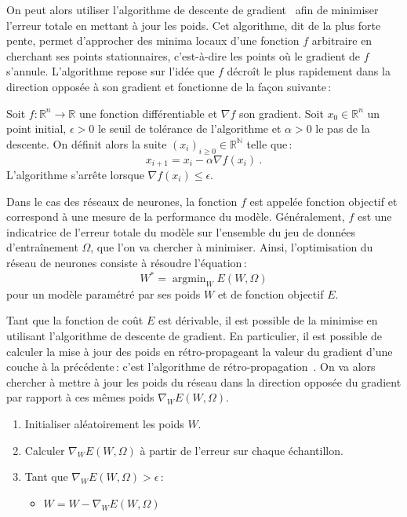 On peut alors utiliser l'algorithme de descente de gradient~\cite{cauchy_comptes_1847} afin de minimiser l'erreur totale en mettant à jour les poids. Cet algorithme, dit de la plus forte pente, permet d'approcher des minima locaux d'une fonction $f$ arbitraire en cherchant ses points stationnaires, c'est-à-dire les points où le gradient de $f$ s'annule. L'algorithme repose sur l'idée que $f$ décroît le plus rapidement dans la direction opposée à son gradient et fonctionne de la façon suivante\,:

\begin{theorem}
  Soit $f : \mathbb{R}^n \rightarrow \mathbb{R}$ une fonction différentiable et $\nabla f$ son gradient. Soit $x_0 \in \mathbb{R}^n$ un point initial, $\epsilon > 0$ le seuil de tolérance de l'algorithme et $\alpha > 0$ le pas de la descente. On définit alors la suite $(x_i)_{i \ge 0} \in \mathbb{R}^\mathbb{N}$ telle que\,:
  $$x_{i+1} = x_i - \alpha \nabla f(x_i)~.$$
  L'algorithme s'arrête lorsque $\nabla f(x_i) \le \epsilon$.
\end{theorem}

Dans le cas des réseaux de neurones, la fonction $f$ est appelée \og fonction objectif \fg et correspond à une mesure de la performance du modèle. Généralement, $f$ est une indicatrice de l'erreur totale du modèle sur l'ensemble du jeu de données d'entraînement $\Omega$, que l'on va chercher à minimiser. Ainsi, l'optimisation du réseau de neurones consiste à résoudre l'équation\,:
$$W^* = \operatorname{argmin}_W E(W, \Omega)$$
 pour un modèle paramétré par ses poids $W$ et de fonction objectif $E$.

Tant que la fonction de coût $E$ est dérivable, il est possible de la minimise en utilisant l'algorithme de descente de gradient. En particulier, il est possible de calculer la mise à jour des poids en rétro-propageant la valeur du gradient d'une couche à la précédente\,: c'est l'algorithme de rétro-propagation~\cite{werbos_beyond_1975,lecun_efficient_1998,rumelhart_learning_1986}. On va alors chercher à mettre à jour les poids du réseau dans la direction opposée du gradient par rapport à ces mêmes poids $\nabla_W E(W, \Omega)$.

\begin{theorem}
  \begin{enumerate}
    \item Initialiser aléatoirement les poids $W$.
    \item Calculer $\nabla_W E(W, \Omega)$ à partir de l'erreur sur chaque échantillon.
    \item Tant que $\nabla_W E(W, \Omega) > \epsilon$\,:
      \begin{itemize}
          \item $W = W - \nabla_W E(W, \Omega)$
      \end{itemize}
  \end{enumerate}
\end{theorem}

